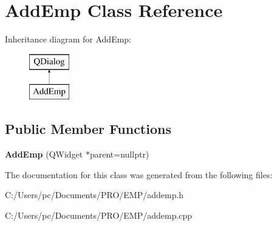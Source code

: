 \hypertarget{class_add_emp}{}\section{Add\+Emp Class Reference}
\label{class_add_emp}
Inheritance diagram for Add\+Emp\+:\begin{figure}[H]
\begin{center}
\leavevmode
\includegraphics[height=2.000000cm]{class_add_emp}
\end{center}
\end{figure}
\subsection*{Public Member Functions}
\begin{DoxyCompactItemize}
\item 
\mbox{\label{class_add_emp_aff93a79c68c22efe3f9074572517fdc7}} 
{\bfseries Add\+Emp} (Q\+Widget $\ast$parent=nullptr)
\end{DoxyCompactItemize}


The documentation for this class was generated from the following files\+:\begin{DoxyCompactItemize}
\item 
C\+:/\+Users/pc/\+Documents/\+P\+R\+O/\+E\+M\+P/addemp.\+h\item 
C\+:/\+Users/pc/\+Documents/\+P\+R\+O/\+E\+M\+P/addemp.\+cpp\end{DoxyCompactItemize}
